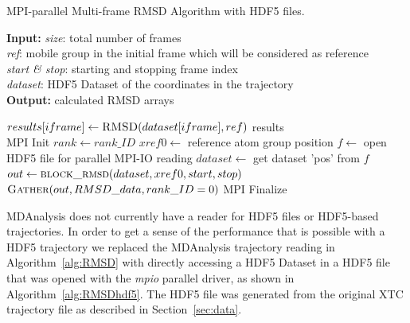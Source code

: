 \begin{algorithm}[ht]
	\scriptsize
	\caption{MPI-parallel Multi-frame RMSD Algorithm with HDF5 files.}
	\label{alg:RMSDhdf5}
	\hspace*{\algorithmicindent} \textbf{Input:} \emph{size}: total number of frames \\
	\hspace*{\algorithmicindent} \emph{ref}: mobile group in the initial frame which will be considered as reference \\
	\hspace*{\algorithmicindent} \emph{start \& stop}: starting and stopping frame index\\
	\hspace*{\algorithmicindent} \emph{dataset}: HDF5 Dataset of the coordinates in the trajectory \\
	\hspace*{\algorithmicindent} \textbf{Output:} calculated RMSD arrays
	\begin{algorithmic}[1]
		\State $results[iframe] \gets \Call{RMSD}{dataset[iframe], ref}$ 
		\EndFor
		\State \Return results
		\EndFunction
		\\        
		\State MPI Init
		\State $rank \gets rank\_ID$
		\State $xref0 \gets$ reference atom group position
                \State $f \gets$ open HDF5 file for parallel MPI-IO reading 
                \State $dataset \gets$ get dataset 'pos' from $f$
		\State $out \gets \Call{block\_rmsd}{dataset, xref0, start, stop}$
                \\
		\State $\Call{Gather}{out, RMSD\_data, rank\_ID=0}$
		\State MPI Finalize
	\end{algorithmic}
\end{algorithm}

MDAnalysis does not currently have a reader for HDF5 files or HDF5-based trajectories.
In order to get a sense of the performance that is possible with a HDF5 trajectory we replaced the MDAnalysis trajectory reading in Algorithm~\ref{alg:RMSD} with directly accessing a HDF5 Dataset in a HDF5 file that was opened with the \emph{mpio} parallel driver, as shown in Algorithm~\ref{alg:RMSDhdf5}.
The HDF5 file was generated from the original XTC trajectory file as described in Section~\ref{sec:data}.